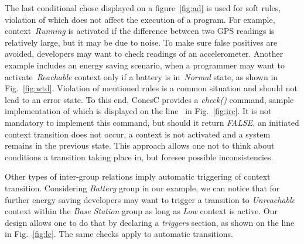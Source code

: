 The last conditional chose displayed on a figure~\ref{fig:ad} is used for soft rules, violation of
which does not affect the execution of a program. For example, context~\emph{Running} is
activated if the difference between two GPS readings is relatively large, but it may be due to noise.
To make sure false positives are avoided, developers may want to check
readings of an accelerometer. Another example includes an energy saving scenario,
when a programmer may want to activate~\emph{Reachable} context only if a battery is
in~\emph{Normal} state, as shown in Fig.~\ref{fig:wtd}.
Violation of mentioned rules is a common situation and should not lead to an error state.
To this end, ConesC provides a \emph{check()} command, sample implementation of which is
displayed on the line~ in Fig.~\ref{fig:irc}. It is not mandatory to implement this
command, but should it return \emph{FALSE}, an initiated context transition does not occur,
a context is not activated and a system remains in the previous state.
This approach allows one not to think about conditions a transition taking
place in, but foresee possible inconsistencies.

Other types of inter-group relations imply automatic triggering of context
transition. Considering \emph{Battery} group in our example, we can notice that
for further energy saving developers may want to trigger a transition to
\emph{Unreachable} context within the \emph{Base Station} group as long as
\emph{Low} context is active. Our design allows one to do that by declaring a
\emph{triggers} section, as shown on the line~ in Fig.~\ref{fig:lc}.
The same checks apply to automatic transitions.




